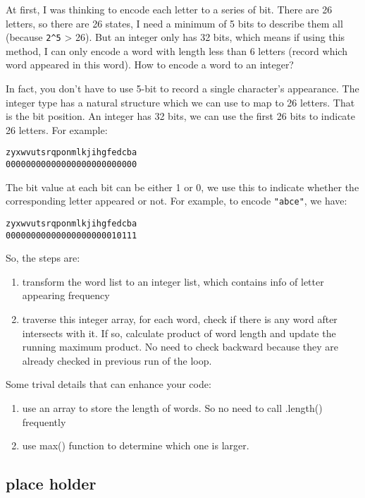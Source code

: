 \documentclass[12pt]{article}
\begin{document}
At first, I was thinking to encode each letter to a series of bit. There are 26 letters, so there are 26 states, I need a minimum of 5 bits to describe them all (because \texttt{2\textasciicircum{}5} > 26). But an integer only has 32 bits, which means if using this method, I can only encode a word with length less than 6 letters (record which word appeared in this word). How to encode a word to an integer?

In fact, you don't have to use 5-bit to record a single character's appearance. The integer type has a natural structure which we can use to map to 26 letters. That is the bit position. An integer has 32 bits, we can use the first 26 bits to indicate 26 letters. For example:
\begin{verbatim}
zyxwvutsrqponmlkjihgfedcba
00000000000000000000000000
\end{verbatim}
The bit value at each bit can be either 1 or 0, we use this to indicate whether the corresponding letter appeared or not. For example, to encode \texttt{"abce"}, we have:
\begin{verbatim}
zyxwvutsrqponmlkjihgfedcba
00000000000000000000010111
\end{verbatim}

So, the steps are:
\begin{enumerate}
\item transform the word list to an integer list, which contains info of letter appearing frequency
\item traverse this integer array, for each word, check if there is any word after intersects with it. If so, calculate product of word length and update the running maximum product. No need to check backward because they are already checked in previous run of the loop.
\end{enumerate}

Some trival details that can enhance your code:
\begin{enumerate}
\item use an array to store the length of words. So no need to call .length() frequently
\item use max() function to determine which one is larger.
\end{enumerate}


\subsection{place holder}
\label{sec:org38651da}
\end{document}
